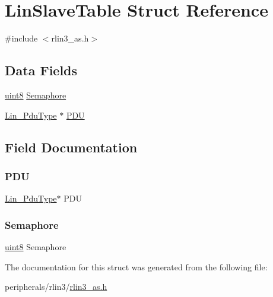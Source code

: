 \hypertarget{struct_lin_slave_table}{}\section{Lin\+Slave\+Table Struct Reference}
\label{struct_lin_slave_table}


{\ttfamily \#include $<$rlin3\+\_\+as.\+h$>$}

\subsection*{Data Fields}
\begin{DoxyCompactItemize}
\item 
\mbox{\hyperlink{rlin3__as_8h_a0a75bc6cad2d642d99f9f41545137f03}{uint8}} \mbox{\hyperlink{struct_lin_slave_table_a5071cfc1ecbd5842e1137911d88b5df0}{Semaphore}}
\item 
\mbox{\hyperlink{struct_lin___pdu_type}{Lin\+\_\+\+Pdu\+Type}} $\ast$ \mbox{\hyperlink{struct_lin_slave_table_ae551af5d6c3a0f7f6f58a3cbe7bfee01}{P\+DU}}
\end{DoxyCompactItemize}


\subsection{Field Documentation}
\mbox{\label{struct_lin_slave_table_ae551af5d6c3a0f7f6f58a3cbe7bfee01}} 
\subsubsection{\texorpdfstring{P\+DU}{PDU}}
{\footnotesize\ttfamily \mbox{\hyperlink{struct_lin___pdu_type}{Lin\+\_\+\+Pdu\+Type}}$\ast$ P\+DU}

\mbox{\label{struct_lin_slave_table_a5071cfc1ecbd5842e1137911d88b5df0}} 
\subsubsection{\texorpdfstring{Semaphore}{Semaphore}}
{\footnotesize\ttfamily \mbox{\hyperlink{rlin3__as_8h_a0a75bc6cad2d642d99f9f41545137f03}{uint8}} Semaphore}



The documentation for this struct was generated from the following file\+:\begin{DoxyCompactItemize}
\item 
peripherals/rlin3/\mbox{\hyperlink{rlin3__as_8h}{rlin3\+\_\+as.\+h}}\end{DoxyCompactItemize}
